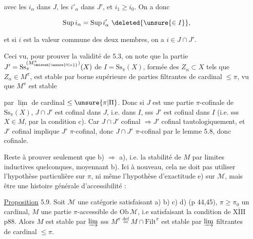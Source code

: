 
avec les $i_\alpha$ dans $J$, les $i'_\alpha$ dans $J'$, et $i_1\geq i_0$.  On a donc

\[
\mathrm{Sup}\,i_\alpha=\mathrm{Sup}\,i'_\alpha\ \deleted{\unsure{\in I}},
\]

et si $i$ est la valeur commune des deux membres, on a $i\in J\cap J'$.

Ceci vu, pour prouver la validité de 5.3, on note que la partie $J'=\mathrm{Ss}^{(M^{\pi}_{\deleted{\unsure{0|\alpha}}})}_{\pi}(X)$ de $I=\mathrm{Ss}_\pi(X)$, formée des $Z_\alpha\subset X$ tels que $Z_\alpha\in M^\pi$, est stable par borne supérieure de parties filtrantes de cardinal $\leq\pi$, vu que $M^\pi$ est stable


par $\underline{\lim}$ de cardinal $\leq\unsure{\pi|\Pi}$. Donc si $J$ est une partie $\pi$-cofinale de $\mathrm{Ss}_{\pi}(X)$, $J\cap J'$ est cofinal dans $J$, i.e. dans $I$, sss $J'$ \deleted{\unsure{$\in$}} est  cofinal dans $I$ (i.e. sss $X\in M$, par la condition c). Car $J\cap J'$ cofinal $\Rightarrow J'$ cofinal tautologiquement, et $J'$ cofinal implique $J'$ $\pi$-cofinal, donc $J\cap J'$ $\pi$-cofinal par le lemme 5.8, donc cofinale.

Reste à prouver seulement que b) $\Rightarrow$ a), i.e. la stabilité de $M$ par limites inductives  quelconques, moyennant  b). Ici à nouveau, cela ne doit pas utiliser l'hypothèse particulière sur $\pi$, ni même l'hypothèse d'exactitude e) sur $\mathcal M$, mais être une histoire générale d'accessibilité :

\uline{Proposition} 5.9. Soit $\mathcal M$ une  catégorie satisfaisant a) b) c) d) (p 44,45), $\pi\geq\pi_0$ un cardinal, $M$ une partie $\pi$-accessible de $\mathrm{Ob}\,\mathcal M$, i.e satisfaisant la condition  de \uline{$\overline{\mathrm{XIII}}$} p88. Alors $M$ est stable par $\varinjlim$  sss $M^\pi\overset{\mathrm{def}}=M\cap\mathrm{Filt}^{\pi}$ est stable par $\varinjlim$ filtrantes de cardinal $\leq\pi$.

